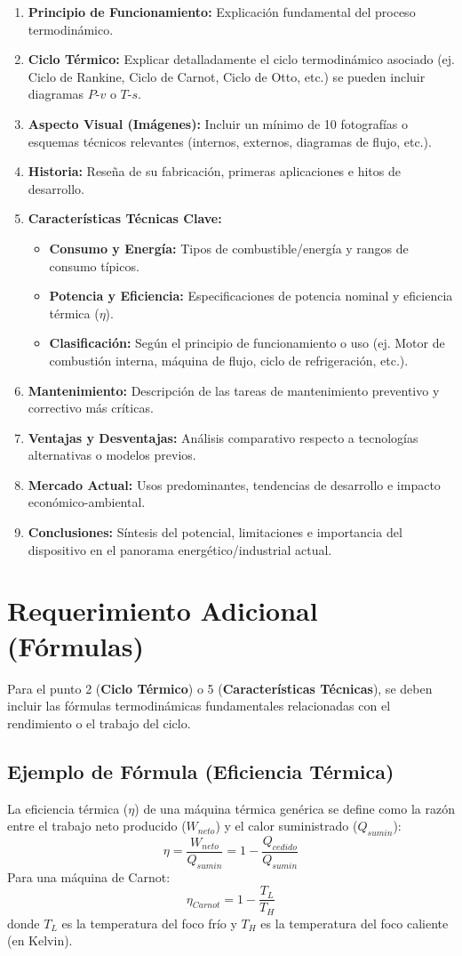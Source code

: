 \documentclass[../main]{subfiles}
\begin{document}
\begin{enumerate}
    \item \textbf{Principio de Funcionamiento:} Explicación fundamental del proceso termodinámico.
    \item \textbf{Ciclo Térmico:} Explicar detalladamente el ciclo termodinámico asociado (ej. Ciclo de Rankine, Ciclo de Carnot, Ciclo de Otto, etc.) \textemdash se pueden incluir diagramas $P$-$v$ o $T$-$s$.
    \item \textbf{Aspecto Visual (Imágenes):} Incluir un mínimo de 10 fotografías o esquemas técnicos relevantes (internos, externos, diagramas de flujo, etc.).
    \item \textbf{Historia:} Reseña de su fabricación, primeras aplicaciones e hitos de desarrollo.
    \item \textbf{Características Técnicas Clave:}
    \begin{itemize}
        \item \textbf{Consumo y Energía:} Tipos de combustible/energía y rangos de consumo típicos.
        \item \textbf{Potencia y Eficiencia:} Especificaciones de potencia nominal y eficiencia térmica ($\eta$).
        \item \textbf{Clasificación:} Según el principio de funcionamiento o uso (ej. Motor de combustión interna, máquina de flujo, ciclo de refrigeración, etc.).
    \end{itemize}
    \item \textbf{Mantenimiento:} Descripción de las tareas de mantenimiento preventivo y correctivo más críticas.
    \item \textbf{Ventajas y Desventajas:} Análisis comparativo respecto a tecnologías alternativas o modelos previos.
    \item \textbf{Mercado Actual:} Usos predominantes, tendencias de desarrollo e impacto económico-ambiental.
    \item \textbf{Conclusiones:} Síntesis del potencial, limitaciones e importancia del dispositivo en el panorama energético/industrial actual.
\end{enumerate}

\section*{Requerimiento Adicional (Fórmulas)}
Para el punto 2 (\textbf{Ciclo Térmico}) o 5 (\textbf{Características Técnicas}), se deben incluir las fórmulas termodinámicas fundamentales relacionadas con el rendimiento o el trabajo del ciclo.

\subsection*{Ejemplo de Fórmula (Eficiencia Térmica)}
La eficiencia térmica ($\eta$) de una máquina térmica genérica se define como la razón entre el trabajo neto producido ($W_{neto}$) y el calor suministrado ($Q_{sumin}$):
$$ \eta = \frac{W_{neto}}{Q_{sumin}} = 1 - \frac{Q_{cedido}}{Q_{sumin}} $$
Para una máquina de Carnot:
$$ \eta_{Carnot} = 1 - \frac{T_L}{T_H} $$
donde $T_L$ es la temperatura del foco frío y $T_H$ es la temperatura del foco caliente (en Kelvin).
\end{document}
